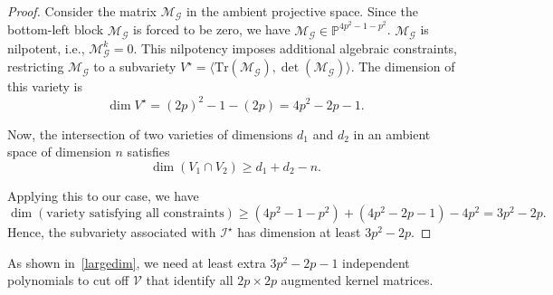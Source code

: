 \documentclass[10pt]{article}
\numberwithin{figure}{section}
\begin{document}
\begin{proof}
    Consider the matrix $\mathcal{M}_{\mathscr{G}}$ in the ambient projective space. 
    Since the bottom-left block $\mathcal{M}_{\mathscr{G}}$ is forced to be zero, 
    we have $\mathcal{M}_{\mathscr{G}} \in \mathbb{P}^{4p^2-1-p^2}$. $\mathcal{M}_{\mathscr{G}}$ is nilpotent, i.e., $\mathcal{M}_{\mathscr{G}}^k = 0$. 
    This nilpotency imposes additional algebraic constraints, restricting $\mathcal{M}_{\mathscr{G}}$ to a subvariety 
    $V^{\star} = \langle \mathrm{Tr}(\mathcal{M}_{\mathscr{G}}), \det(\mathcal{M}_{\mathscr{G}}) \rangle$. 
    The dimension of this variety is
    \[
        \dim V^{\star} = (2p)^2 - 1 - (2p) = 4p^2 - 2p - 1.
    \]

    Now, the intersection of two varieties of dimensions $d_1$ and $d_2$ in an ambient space of dimension $n$ satisfies
    \[
        \dim(V_1 \cap V_2) \ge d_1 + d_2 - n.
    \]

    Applying this to our case, we have
    \[
        \dim(\text{variety satisfying all constraints}) 
        \ge (4p^2 - 1 - p^2) + (4p^2 - 2p - 1) - 4p^2
        = 3p^2 - 2p.
    \]
    Hence, the subvariety associated with $\mathcal{I}^{\star}$ has dimension at least $3p^2 - 2p$.
\end{proof}
As shown in~\autoref{largedim}, we need at least extra $3p^2-2p-1$ independent polynomials to cut off $\mathcal{V}$ that identify all $2p\times 2p$ augmented kernel matrices.
\end{document}
